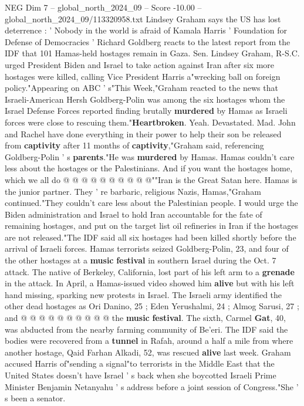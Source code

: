 \begin{textsample}{NEG Dim 7 – global\_north\_2024\_09 – Score -10.00 – global\_north\_2024\_09/113320958.txt}  \label{ex:f7_neg_019}
Lindsey Graham says the US has lost deterrence : ' Nobody in the world is afraid of Kamala Harris ' Foundation for Defense of Democracies ' Richard Goldberg reacts to the latest report from the IDF that 101 Hamas-held hostages remain in Gaza.
Sen.
Lindsey Graham, R-S.C. urged President Biden and Israel to take action against Iran after six more hostages were killed, calling Vice President Harris a"wrecking ball on foreign policy."Appearing on ABC ' s"This Week,"Graham reacted to the news that Israeli-American Hersh Goldberg-Polin was among the six hostages whom the Israel Defense Forces reported finding brutally \textbf{murdered} by Hamas as Israeli forces were close to rescuing them."\textbf{Heartbroken}.
Yeah.
Devastated.
Mad.
John and Rachel have done everything in their power to help their son be released from \textbf{captivity} after 11 months of \textbf{captivity},"Graham said, referencing Goldberg-Polin ' s \textbf{parents}."He was \textbf{murdered} by Hamas.
Hamas couldn't care less about the hostages or the Palestinians.
And if you want the hostages home, which we all do @ @ @ @ @ @ @ @ @ @""Iran is the Great Satan here.
Hamas is the junior partner.
They ' re barbaric, religious Nazis, Hamas,"Graham continued."They couldn't care less about the Palestinian people.
I would urge the Biden administration and Israel to hold Iran accountable for the fate of remaining hostages, and put on the target list oil refineries in Iran if the hostages are not released."The IDF said all six hostages had been killed shortly before the arrival of Israeli forces.
Hamas terrorists seized Goldberg-Polin, 23, and four of the other hostages at a \textbf{music} \textbf{festival} in southern Israel during the Oct. 7 attack.
The native of Berkeley, California, lost part of his left arm to a \textbf{grenade} in the attack.
In April, a Hamas-issued video showed him \textbf{alive} but with his left hand missing, sparking new protests in Israel.
The Israeli army identified the other dead hostages as Ori Danino, 25 ; Eden Yerushalmi, 24 ; Almog Sarusi, 27 ; and @ @ @ @ @ @ @ @ @ @ the \textbf{music} \textbf{festival}.
The sixth, Carmel \textbf{Gat}, 40, was abducted from the nearby farming community of Be'eri.
The IDF said the bodies were recovered from a \textbf{tunnel} in Rafah, around a half a mile from where another hostage, Qaid Farhan Alkadi, 52, was rescued \textbf{alive} last week.
Graham accused Harris of"sending a signal"to terrorists in the Middle East that the United States doesn't have Israel ' s back when she boycotted Israeli Prime Minister Benjamin Netanyahu ' s address before a joint session of Congress."She ' s been a senator.

\end{textsample}
